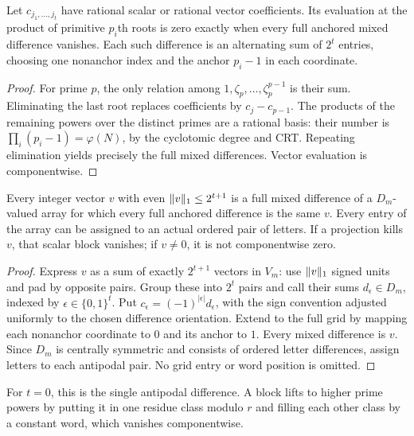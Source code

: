 \begin{lemma}\label{ext:lem:mixed}
Let $c_{j_1,\ldots,j_t}$ have rational scalar or rational vector coefficients. Its evaluation at the product of primitive $p_i$th roots is zero exactly when every full anchored mixed difference vanishes. Each such difference is an alternating sum of $2^t$ entries, choosing one nonanchor index and the anchor $p_i-1$ in each coordinate.
\end{lemma}
\begin{proof}
For prime $p$, the only relation among $1,\zeta_p,\ldots,\zeta_p^{p-1}$ is their sum. Eliminating the last root replaces coefficients by $c_j-c_{p-1}$. The products of the remaining powers over the distinct primes are a rational basis: their number is $\prod_i(p_i-1)=\varphi(N)$, by the cyclotomic degree and CRT. Repeating elimination yields precisely the full mixed differences. Vector evaluation is componentwise.
\end{proof}

\begin{lemma}\label{ext:lem:realization}
Every integer vector $v$ with even $\lVert v\rVert_1\le2^{t+1}$ is a full mixed difference of a $D_m$-valued array for which every full anchored difference is the same $v$. Every entry of the array can be assigned to an actual ordered pair of letters. If a projection kills $v$, that scalar block vanishes; if $v\ne0$, it is not componentwise zero.
\end{lemma}
\begin{proof}
Express $v$ as a sum of exactly $2^{t+1}$ vectors in $V_m$: use $\lVert v\rVert_1$ signed units and pad by opposite pairs. Group these into $2^t$ pairs and call their sums $d_\epsilon\in D_m$, indexed by $\epsilon\in\{0,1\}^t$. Put $c_\epsilon=(-1)^{|\epsilon|}d_\epsilon$, with the sign convention adjusted uniformly to the chosen difference orientation. Extend to the full grid by mapping each nonanchor coordinate to $0$ and its anchor to $1$. Every mixed difference is $v$. Since $D_m$ is centrally symmetric and consists of ordered letter differences, assign letters to each antipodal pair. No grid entry or word position is omitted.
\end{proof}
For $t=0$, this is the single antipodal difference. A block lifts to higher prime powers by putting it in one residue class modulo $r$ and filling each other class by a constant word, which vanishes componentwise.

